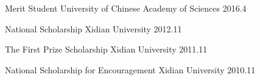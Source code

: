 



\begin{cvhonors}

  \cvhonor
    {Merit Student} %
    {University of Chinese Academy of Sciences} %
    {} %
    {2016.4} %

  \cvhonor
    {National Scholarship} %
    {Xidian University} %
    {} %
    {2012.11} %

  \cvhonor
    {The First Prize Scholarship} %
    {Xidian University} %
    {} %
    {2011.11} %

  \cvhonor
    {National Scholarship for Encouragement} %
    {Xidian University} %
    {} %
    {2010.11} %

\end{cvhonors}
